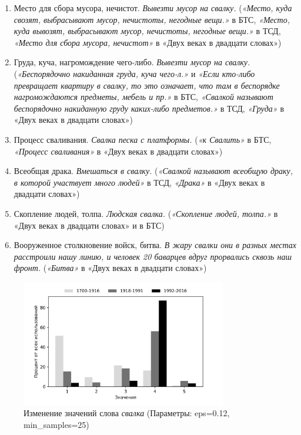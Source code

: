 \begin{enumerate}
    \item Место для сбора мусора, нечистот. \textit{Вывезти мусор на свалку.}
(\textit{«Место, куда свозят, выбрасывают мусор, нечистоты, негодные вещи.»} в БТС,
\textit{«Место, куда вывозят, выбрасывают мусор, нечистоты, негодные вещи.»} в ТСД,
\textit{«Место для сбора мусора, нечистот»} в «Двух веках в двадцати словах»)
    \item Груда, куча, нагромождение чего-либо. \textit{Вывезти мусор на свалку.}
(\textit{«Беспорядочно накиданная груда, куча чего-л.»} и
\textit{«Если кто-либо превращает квартиру в свалку, то это означает, что там в беспорядке нагромождаются предметы, мебель и пр.»} в БТС,
\textit{«Свалкой называют беспорядочно накиданную груду каких-либо предметов.»} в ТСД,
\textit{«Груда»} в «Двух веках в двадцати словах»)
    \item Процесс сваливания. \textit{Свалка песка с платформы.}
(\textit{«к Свалить»} в БТС,
\textit{«Процесс сваливания»} в «Двух веках в двадцати словах»)
    \item Всеобщая драка. \textit{Вмешаться в свалку.}
(\textit{«Свалкой называют всеобщую драку, в которой участвует много людей»} в ТСД,
\textit{«Драка»} в «Двух веках в двадцати словах»)
    \item Скопление людей, толпа. \textit{Людская свалка.}
(\textit{«Скопление людей, толпа.»} в «Двух веках в двадцати словах» и в БТС)
    \item Вооруженное столкновение войск, битва. \textit{В жару свалки они в разных местах расстроили нашу линию, и человек 20 баварцев вдруг прорвались сквозь наш фронт.}
(\textit{«Битва»} в «Двух веках в двадцати словах»)
\end{enumerate}

\begin{figure}[H]
	\centering
	\includegraphics[width=0.8\textwidth]{img/visualizations/svalka_minimal}
	\caption{Изменение значений слова \textit{свалка} (Параметры: eps=0.12, min\_samples=25)}
	\label{fig:Свалка}
\end{figure}

